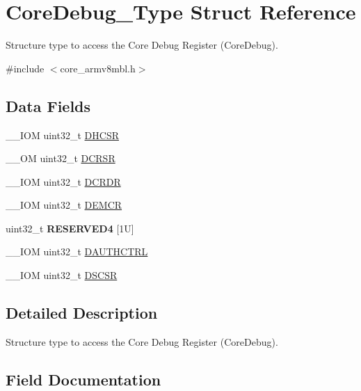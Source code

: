 \hypertarget{struct_core_debug___type}{}\section{Core\+Debug\+\_\+\+Type Struct Reference}
\label{struct_core_debug___type}


Structure type to access the Core Debug Register (Core\+Debug).  




{\ttfamily \#include $<$core\+\_\+armv8mbl.\+h$>$}

\subsection*{Data Fields}
\begin{DoxyCompactItemize}
\item 
\+\_\+\+\_\+\+I\+OM uint32\+\_\+t \hyperlink{struct_core_debug___type_ad63554e4650da91a8e79929cbb63db66}{D\+H\+C\+SR}
\item 
\+\_\+\+\_\+\+OM uint32\+\_\+t \hyperlink{struct_core_debug___type_af907cf64577eaf927dac6787df6dd98b}{D\+C\+R\+SR}
\item 
\+\_\+\+\_\+\+I\+OM uint32\+\_\+t \hyperlink{struct_core_debug___type_aab3cc92ef07bc1f04b3a3aa6db2c2d55}{D\+C\+R\+DR}
\item 
\+\_\+\+\_\+\+I\+OM uint32\+\_\+t \hyperlink{struct_core_debug___type_aeb3126abc4c258a858f21f356c0df6ee}{D\+E\+M\+CR}
\item 
\mbox{\label{struct_core_debug___type_ac965e9b3abb1519676f2a6a959eaedb2}} 
uint32\+\_\+t {\bfseries R\+E\+S\+E\+R\+V\+E\+D4} \mbox{[}1\+U\mbox{]}
\item 
\+\_\+\+\_\+\+I\+OM uint32\+\_\+t \hyperlink{struct_core_debug___type_a1b319a8279b9ff2572ab5391dba5bb88}{D\+A\+U\+T\+H\+C\+T\+RL}
\item 
\+\_\+\+\_\+\+I\+OM uint32\+\_\+t \hyperlink{struct_core_debug___type_ad9fa5e915e038e20b9be88d54d432fb8}{D\+S\+C\+SR}
\end{DoxyCompactItemize}


\subsection{Detailed Description}
Structure type to access the Core Debug Register (Core\+Debug). 

\subsection{Field Documentation}
\mbox{\label{struct_core_debug___type_a1b319a8279b9ff2572ab5391dba5bb88}} 
